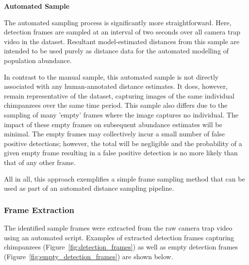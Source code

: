 \vspace{5mm}
\textbf{Automated Sample}

The automated sampling process is significantly more straightforward.
Here, detection frames are sampled at an interval of two seconds over all camera trap video in
the dataset.
Resultant model-estimated distances from this sample are intended to be used purely as distance
data for the automated modelling of population abundance.

In contrast to the manual sample, this automated sample is not directly associated with any
human-annotated distance estimates.
It does, however, remain representative of the dataset, capturing images of the same individual
chimpanzees over the same time period.
This sample also differs due to the sampling of many 'empty' frames where the image captures no
individual.
The impact of these empty frames on subsequent abundance estimates will be minimal.
The empty frames may collectively incur a small number of false positive detections; however,
the total will be negligible and the probability of a given empty frame resulting in a false
positive detection is no more likely than that of any other frame.

All in all, this approach exemplifies a simple frame sampling method that can be used as part of
an automated distance sampling pipeline.

\vspace{-2.5mm}

\subsubsection{Frame Extraction}
The identified sample frames were extracted from the raw camera trap video using an automated
script.
Examples of extracted detection frames capturing chimpanzees (Figure~\ref{fig:detection_frames})
as well as empty detection frames (Figure~\ref{fig:empty_detection_frames}) are shown below.

\vspace{1cm}


